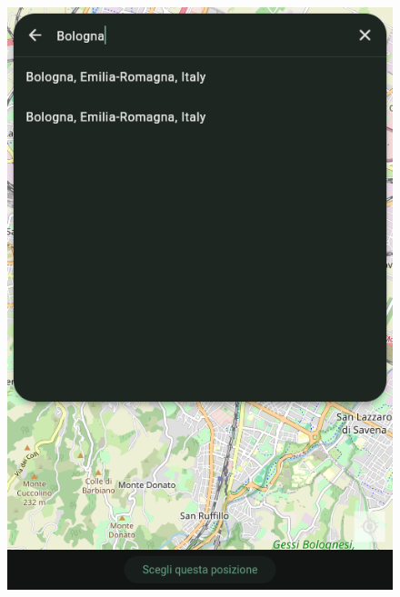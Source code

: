 \documentclass[a4paper,12pt]{article}
\begin{document}
\begin{figure}[h]
    \begin{minipage}{0.32\textwidth}
        \centering
        \label{fig:search_map}
        \includegraphics[width=1\linewidth]{img/search_map.png}
    \end{minipage}
    \begin{minipage}{0.32\textwidth}
        \centering
        \label{fig:select_radius}

\end{minipage}
\end{figure}
\end{document}
